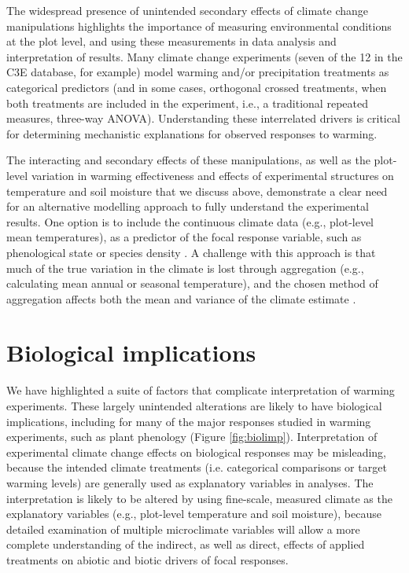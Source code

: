 \documentclass{article}
\begin{document}

\par The widespread presence of unintended secondary effects of climate change manipulations highlights the importance of measuring environmental conditions at the plot level, and using these measurements in data analysis and interpretation of results. Many climate change experiments (seven of the 12 in the C3E database, for example) model warming and/or precipitation treatments as categorical predictors (and in some cases, orthogonal crossed treatments, when both treatments are included in the experiment, i.e., a traditional repeated measures, three-way ANOVA). Understanding these interrelated drivers is critical for determining mechanistic explanations for observed responses to warming.

\par The interacting and secondary effects of these manipulations, as well as the plot-level variation in warming effectiveness and effects of experimental structures on temperature and soil moisture that we discuss above, demonstrate a clear need for an alternative modelling approach to fully understand the experimental results. One option is to include the continuous climate data (e.g., plot-level mean temperatures), as a predictor of the focal response variable, such as phenological state or species density \citep [e.g.,][]{marchin2015, pelini2014}. A challenge with this approach is that much of the true variation in the climate is lost through aggregation (e.g., calculating mean annual or seasonal temperature), and the chosen method of aggregation affects both the mean and variance of the climate estimate \citep [e.g.,][]{clark2014b}. 

\section* {Biological implications}

\par We have highlighted a suite of factors that complicate interpretation of warming experiments. These largely unintended alterations are likely to have biological implications, including for many of the major responses studied in warming experiments, such as plant phenology (Figure \ref{fig:biolimp}). Interpretation of experimental climate change effects on biological responses may be misleading, because the intended climate treatments (i.e. categorical comparisons or target warming levels) are generally used as explanatory variables in analyses. The interpretation is likely to be altered by using fine-scale, measured climate as the explanatory variables (e.g., plot-level temperature and soil moisture), because detailed examination of multiple microclimate variables will allow a more complete understanding of the indirect, as well as direct, effects of applied treatments on abiotic and biotic drivers of focal responses.
\end{document}
